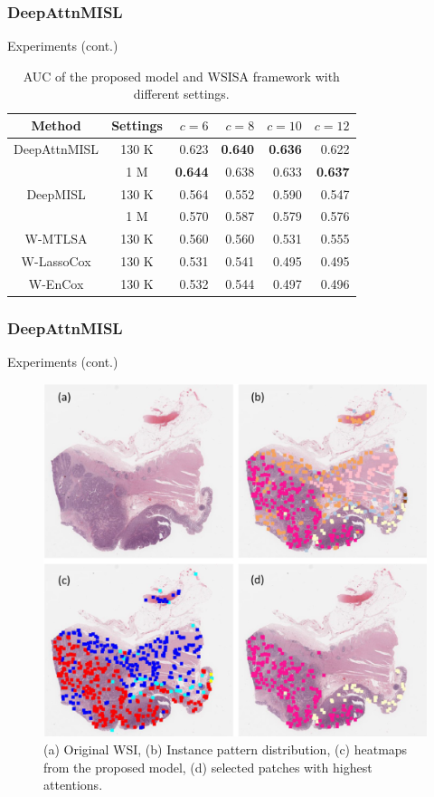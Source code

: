 \documentclass{beamer}
\begin{document}
	\begin{frame}
		\frametitle{DeepAttnMISL}
		Experiments (cont.)
		
		\begin{table}[H]
			\begin{center}
				\begin{tabular}{ c c r r r r }
					\hline
					Method & Settings & $c = 6$ & $c = 8$ & $c = 10$ & $c = 12$ \\
					\hline
					DeepAttnMISL & 130 K & 0.623 & \textbf{0.640} & \textbf{0.636} & 0.622 \\ 
					& 1 M & \textbf{0.644} & 0.638 & 0.633 & \textbf{0.637} \\
					DeepMISL & 130 K & 0.564 & 0.552 & 0.590 & 	0.547 \\
					& 1 M & 0.570 & 0.587 & 0.579 & 0.576 \\
					W-MTLSA & 130 K & 0.560 & 0.560 & 0.531 & 	0.555 \\
					W-LassoCox & 130 K & 0.531 & 0.541 & 0.495 & 0.495 \\
					W-EnCox & 130 K & 0.532 & 0.544 & 0.497 & 0.496 \\
					\hline
				\end{tabular}
			\end{center}
			\caption{AUC of the proposed model and WSISA framework with different settings.}
		\end{table} 
		
	\end{frame}
	
	\begin{frame}
		\frametitle{DeepAttnMISL}
		Experiments (cont.)
		
		\begin{figure}[H]
			\centering
			\includegraphics[scale=0.15]{figures/heat1.png}
			\caption{(a) Original WSI, (b) Instance pattern distribution, (c) heatmaps from the proposed model, (d) selected patches with highest attentions.}
			\label{fig:heat1}
		\end{figure}
	\end{frame}
	
\end{document}
